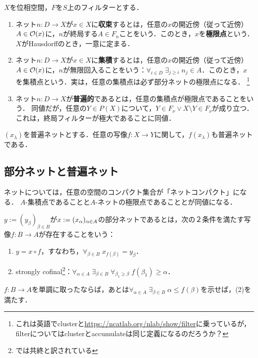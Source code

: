 \documentclass[uplatex,dvipdfmx]{jsreport}
\begin{document}
\begin{definition}
    $X$を位相空間，$F$を$S$上のフィルターとする．
    \begin{enumerate}
        \item ネット$n:D\to X$が$x\in X$に\textbf{収束}するとは，任意の$x$の開近傍（従って近傍）$A\in\mathcal{O}(x)$に，$n$が終局する$A\in F_n$ことをいう．このとき，$x$を\textbf{極限点}という．$X$がHausdorffのとき，一意に定まる．
        \item ネット$n:D\to X$が$x\in X$に\textbf{集積}するとは，任意の$x$の開近傍（従って近傍）$A\in\mathcal{O}(x)$に，$n$が無限回入ることをいう：$\forall_{i\in D}\;\exists_{j\ge i}\;n_j\in A$．このとき，$x$を集積点という．実は，任意の集積点は必ず部分ネットの極限点になる．
        \footnote{これは英語でclusterと\url{https://ncatlab.org/nlab/show/filter}に乗っているが，filterについてはclusterとaccumulateは同じ定義になるのだろうか？}
        \item ネット$n:D\to X$が\textbf{普遍的}であるとは，任意の集積点が極限点であることをいう．
        同値だが，任意の$Y\in P(X)$について，$Y\in F_\nu\lor X\setminus Y\in F_\nu$が成り立つ．
        これは，終局フィルターが極大であることに同値．
    \end{enumerate}
\end{definition}

\begin{proposition}
    $(x_\lambda)$を普遍ネットとする．任意の写像$f:X\to Y$に関して，$f(x_\lambda)$も普遍ネットである．
\end{proposition}

\subsection{部分ネットと普遍ネット}

\begin{tcolorbox}[colframe=ForestGreen, colback=ForestGreen!10!white,breakable,colbacktitle=ForestGreen!40!white,coltitle=black,fonttitle=\bfseries\sffamily,
title=]
    ネットについては，任意の空間のコンパクト集合が「ネットコンパクト」になる．
    $A$-集積点であることと$A$-ネットの極限点であることとが同値になる．
\end{tcolorbox}

\begin{definition}\label{def-subnet-Kelley}
    $y:=(y_\beta)_{\beta\in B}$が$x:=(x_\alpha)_{\alpha\in A}$の部分ネットであるとは，次の２条件を満たす写像$f:B\to A$が存在することをいう：
    \begin{enumerate}
        \item $y=x\circ f$，すなわち，$\forall_{\beta\in B}\;x_{f(\beta)}=y_\beta$．
        \item strongly cofinal\footnote{\cite{彌永}では共終と訳されている}：$\forall_{\alpha\in A}\;\exists_{\beta\in B}\;\forall_{\beta_1\ge\beta}\;f(\beta_1)\ge\alpha$．
    \end{enumerate}
    $f:B\to A$を単調に取ったならば，あとは$\forall_{\alpha\in A}\;\exists_{\beta\in B}\;\alpha\le f(\beta)$を示せば，(2)を満たす．
\end{definition}
\end{document}

